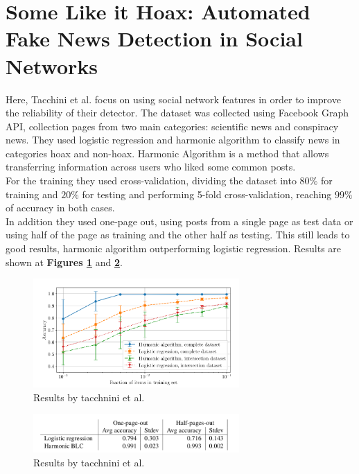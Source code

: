 \section{Some Like it Hoax: Automated Fake News Detection in Social Networks \cite{Tacchini2017}}
Here, Tacchini et al. focus on using social network features in order to improve the reliability of their detector. The dataset was collected using Facebook Graph API, collection pages from two main categories: scientific news and conspiracy news. They used logistic regression and harmonic algorithm\cite{NIPS2011_4396} to classify news in categories hoax and non-hoax. Harmonic Algorithm is a method that allows transferring information across users who liked some common posts. \\

For the training they used cross-validation, dividing the dataset into $80\%$ for training and $20\%$ for testing and performing 5-fold cross-validation, reaching $99\%$ of accuracy in both cases. \\

In addition they used one-page out, using posts from a single page as test data or using half of the page as training and the other half as testing. This still leads to good results, harmonic algorithm outperforming logistic regression. Results are shown at \textbf{Figures \ref{fig:chap1:tacchini}} and \textbf{\ref{fig:chap1:tacchini2}}. \\


\begin{figure}[h]
 \centering
 \includegraphics[width=0.7\textwidth]{images/chap1_bis/rev4.png}
 \caption{Results by tacchnini et al. }
 \label{fig:chap1:tacchini}
\end{figure}

\begin{figure}[h]
 \centering
 \includegraphics[width=0.7\textwidth]{images/chap1_bis/rev5.png}
 \caption{Results by tacchnini et al. }
 \label{fig:chap1:tacchini2}
\end{figure}


